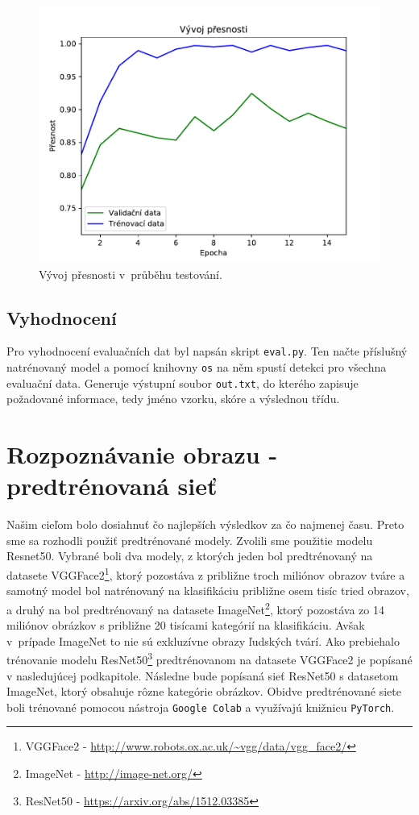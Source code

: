 \documentclass{article}
\begin{document}
\begin{figure}[H]
    \centering
    \includegraphics[width=.75\textwidth]{img/acc-plt.pdf}
    \caption{Vývoj přesnosti v~průběhu testování.}
    \label{vyvoj_presnosti}
\end{figure}

\subsection{Vyhodnocení} \label{evaluace}

Pro vyhodnocení evaluačních dat byl napsán skript \texttt{eval.py}.
Ten načte příslušný natrénovaný model a pomocí knihovny \texttt{os} na něm spustí detekci
pro všechna evaluační data.
Generuje výstupní soubor \texttt{out.txt}, do kterého zapisuje požadované informace,
tedy jméno vzorku, skóre a výslednou třídu.


\section{Rozpoznávanie obrazu - predtrénovaná sieť}
Našim cieľom bolo dosiahnuť čo najlepších výsledkov za čo najmenej času. Preto sme sa rozhodli použiť predtrénované modely. Zvolili sme použitie modelu Resnet50. Vybrané boli dva modely, z ktorých jeden bol predtrénovaný na datasete VGGFace2\footnote{VGGFace2 - \url{http://www.robots.ox.ac.uk/~vgg/data/vgg_face2/}}, ktorý pozostáva z približne troch miliónov obrazov tváre a samotný model bol natrénovaný na klasifikáciu približne osem tisíc tried obrazov, a druhý na bol predtrénovaný na datasete ImageNet\footnote{ImageNet - \url{http://image-net.org/}}, ktorý pozostáva zo 14 miliónov obrázkov s približne 20 tisícami kategórií na klasifikáciu. Avšak v~prípade ImageNet to nie sú exkluzívne obrazy ľudských tvárí. Ako prebiehalo trénovanie modelu ResNet50\footnote{ResNet50 - \url{https://arxiv.org/abs/1512.03385}} predtrénovanom na datasete VGGFace2 je popísané v nasledujúcej podkapitole. Následne bude popísaná sieť ResNet50 s datasetom ImageNet, ktorý obsahuje rôzne kategórie obrázkov. Obidve predtrénované siete boli trénované pomocou nástroja \texttt{Google Colab} a využívajú knižnicu \texttt{PyTorch}.
\end{document}
